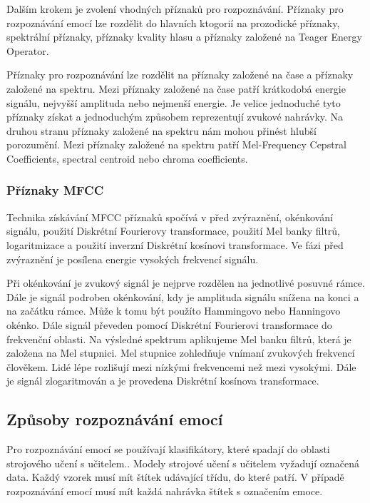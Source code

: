 \documentclass[FM,BP]{tulthesis}
\begin{document}
Dalším krokem je zvolení vhodných příznaků pro rozpoznávání. Příznaky pro rozpoznávání emocí lze rozdělit do hlavních ktogorií na prozodické příznaky, spektrální příznaky, příznaky kvality hlasu a příznaky založené na Teager Energy Operator.

Příznaky pro rozpoznávání lze rozdělit na příznaky založené na čase a příznaky založené na spektru. Mezi příznaky založené na čase patří krátkodobá energie signálu, nejvyšší amplituda nebo nejmenší energie. Je velice jednoduché tyto příznaky získat a jednoduchým způsobem reprezentují zvukové nahrávky. Na druhou stranu příznaky založené na spektru nám mohou přinést hlubší porozumění. Mezi příznaky založené na spektru patří Mel-Frequency Cepstral Coefficients, spectral centroid nebo chroma coefficients.\cite{DBLP:journals/corr/abs-1912-10458}

\subsubsection{Příznaky MFCC}
Technika získávání MFCC příznaků spočívá v před zvýraznění, okénkování signálu, použití Diskrétní Fourierovy transformace, použití Mel banky filtrů, logaritmizace a použití inverzní Diskrétní kosínovi transformace. Ve fázi před zvýraznění je posílena energie vysokých frekvencí signálu. 

Při okénkování je zvukový signál je nejprve rozdělen na jednotlivé posuvné rámce. Dále je signál podroben okénkování, kdy je amplituda signálu snížena na konci a na začátku rámce. Může k tomu být použíto Hammingovo nebo Hanningovo okénko. Dále signál převeden pomocí Diskrétní Fourierovi transformace do frekvenční oblasti. Na výsledné spektrum aplikujeme Mel banku filtrů, která je založena na Mel stupnici. Mel stupnice zohledňuje vnímaní zvukových frekvencí člověkem. Lidé lépe rozlišují mezi nízkými frekvencemi než mezi vysokými. Dále je signál zlogaritmován a je provedena Diskrétní kosínova transformace. \cite{hui_2019}

\subsection{Způsoby rozpoznávání emocí}
Pro rozpoznávání emocí se používají klasifikátory, které spadají do oblasti strojového učení s učitelem.\cite{DBLP:journals/speech/AkcayO20}. Modely strojové učení s učitelem vyžadují označená data. Každý vzorek musí mít štítek udávající třídu, do které patří. V případě rozpoznávání emocí musí mít každá nahrávka štítek s označením emoce.
\end{document}
